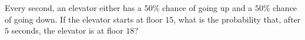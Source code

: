 Every second, an elevator either has a $50\%$ chance of going up and a $50\%$ chance of going down. If the elevator starts at floor $15$, what is the probability that, after $5$ seconds, the elevator is at floor $18$?
